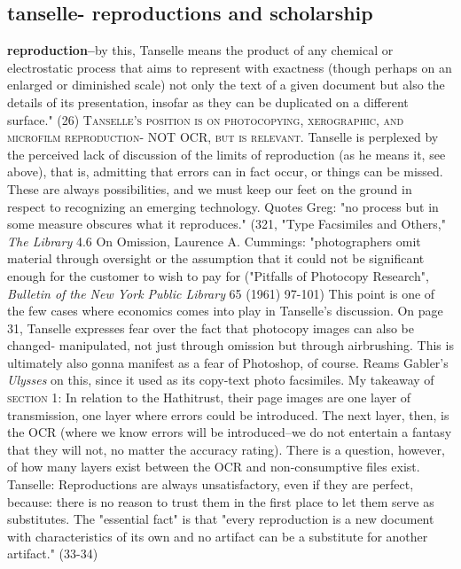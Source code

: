\documentclass[course, english]{Notes}
\newcommand{\n}{\scalebox{2}{\textbf{\framebox{$\aleph$} } } }
\begin{document}
\subsection{tanselle- reproductions and scholarship}
\begin{outline}
\1 \textbf{reproduction--}by this, Tanselle means the product of any chemical or electrostatic process that aims to represent with exactness (though perhaps on an enlarged or diminished scale) not only the text of a given document but also the details of its presentation, insofar as they can be duplicated on a different surface." (26)
\1 \textsc{Tanselle's position is on photocopying, xerographic, and microfilm reproduction- NOT OCR, but is relevant. }
\1 \n Tanselle is perplexed by the perceived lack of discussion of the limits of reproduction (as he means it, see above), that is, admitting that errors can in fact occur, or things can be missed. These are always possibilities, and we must keep our feet on the ground in respect to recognizing an emerging technology.
\1 Quotes Greg: "no process but in some measure obscures what it reproduces." (321, "Type Facsimiles and Others," \emph{The Library} 4.6
\1 On Omission, Laurence A. Cummings: "photographers omit material through oversight or the assumption that it could not be significant enough for the customer to wish to pay for ("Pitfalls of Photocopy Research", \emph{Bulletin of the New York Public Library} 65 (1961) 97-101)
\2 \n This point is one of the few cases where economics comes into play in Tanselle's discussion.
\1 On page 31, Tanselle expresses fear over the fact that photocopy images can also be changed- manipulated, not just through omission but through airbrushing. This is ultimately also gonna manifest as a fear of Photoshop, of course. 
\2 Reams Gabler's \emph{Ulysses} on this, since it used as its copy-text photo facsimiles.
\1 \n My takeaway of \textsc{section 1}: In relation to the Hathitrust, their page images are one layer of transmission, one layer where errors could be introduced. The next layer, then, is the OCR (where we know errors will be introduced--we do not entertain a fantasy that they will not, no matter the accuracy rating). There is a question, however, of how many layers exist between the OCR and non-consumptive files exist.
\1 Tanselle: Reproductions are always unsatisfactory, even if they are perfect, because:
	\2 there is no reason to trust them in the first place to let them serve as substitutes. The "essential fact" is that "every reproduction is a new document with characteristics of its own and no artifact can be a substitute for another artifact." (33-34)

\end{outline}
\end{document}
